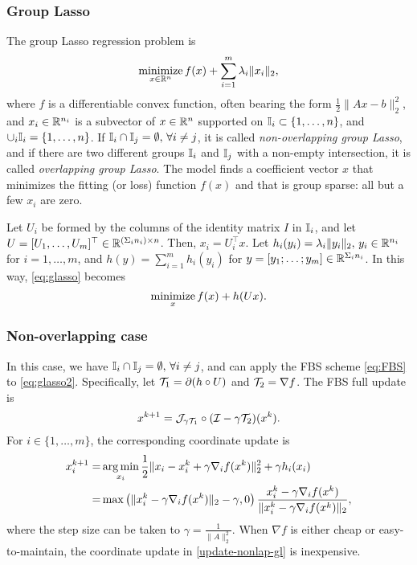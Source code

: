 \subsubsection{Group Lasso}\label{sec:glasso}
The group Lasso   regression problem \cite{YL2006GrpLasso} is 
\begin{equation}\label{eq:glasso}
\Min_{x\in\RR^n}  f(x)+\sum_{i=1}^m\lambda_i\|x_i\|_2,
\end{equation} 
where $ f$ is a differentiable convex function, often bearing the form $\frac{1}{2}\|Ax-b\|_2^2$, and $x_i\in \mathbb{R}^{n_i}$ is a subvector of $x\in\mathbb{R}^n$ supported on $\mathbb{I}_i\subset \{1,\dots,n\}$, and $\cup_i \mathbb{I}_i=\{1,\dots,n\}$. If $\mathbb{I}_i\cap \mathbb{I}_j =\emptyset, \,\forall i\neq j$, it is called \emph{non-overlapping group Lasso}, and if there are two different groups $\mathbb{I}_i$ and $\mathbb{I}_j$ with a non-empty intersection, it is called \emph{overlapping group Lasso}. The model finds a coefficient vector $x$ that minimizes the fitting (or loss) function $f(x)$ and that is group sparse: all but a few $x_i$ are zero.  

Let $U_i$ be formed by the columns of the identity matrix $I$ in $\mathbb{I}_i$, and let $U=[U_1,\ldots,U_m]^\top\in\mathbb{R}^{(\Sigma_i n_i)\times n}$. Then, $x_i=U_i^\top x$. Let $h_i(y_i)=\lambda_i\|y_i\|_2,\,y_i\in\mathbb{R}^{n_i}$ for $i=1,\ldots,m$, and $h(y)=\sum_{i=1}^m h_i(y_i)$ for $y=[y_1;\ldots;y_m]\in\mathbb{R}^{\Sigma_i n_i}$. In this way, \eqref{eq:glasso} becomes
\begin{equation}\label{eq:glasso2}
\Min_x f(x)+h(Ux).
\end{equation}

\subsubsection*{Non-overlapping case} In this case, we have $\mathbb{I}_i\cap \mathbb{I}_j =\emptyset, \,\forall i\neq j$, and can apply the FBS scheme \eqref{eq:FBS} to \eqref{eq:glasso2}. Specifically, let ${\mathcal{T}}_1=\partial (h\circ U)$ and ${\mathcal{T}}_2=\nabla f$. The FBS full update is 
$$x^{k+1}={\mathcal{J}}_{\gamma {\mathcal{T}}_1}\circ({\mathcal{I}}-\gamma{\mathcal{T}}_2)(x^k).$$
For $i\in\{1,\ldots,m\}$, the corresponding coordinate update is
\begin{subequations}\label{update-nonlap-gl}
\begin{align}
x_i^{k+1}=&\argmin_{x_i}\frac{1}{2}\|x_i-x_i^k+\gamma \nabla_i f(x^k)\|_2^2+ \gamma h_i(x_i)\\
=&\max\left(\|x_i^k-\gamma \nabla_i f(x^k)\|_2-\gamma,0\right)\frac{x_i^k-\gamma \nabla_i f(x^k)}{\|x_i^k-\gamma \nabla_i f(x^k)\|_2},
\end{align} 
\end{subequations}
where the step size can be taken to $\gamma=\frac{1}{\|A\|_2^2}$. When $\nabla f$ is either cheap or easy-to-maintain,  the coordinate update in \eqref{update-nonlap-gl} is inexpensive.

